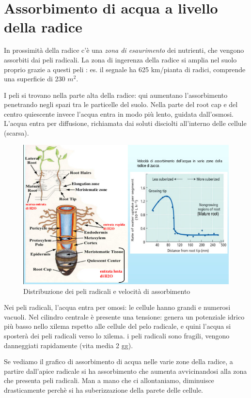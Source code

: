 \documentclass[a4paper,12pt]{book}
\begin{document}
\section{Assorbimento di acqua a livello della radice}
In prossimità della radice c'è  una \emph{zona di esaurimento} dei nutrienti, che vengono assorbiti dai peli radicali. La zona di ingerenza della radice si amplia nel suolo proprio grazie a questi peli : es. il segnale ha 625 km/pianta di radici, comprende una superficie di 230 $m^{2}$.


I peli si trovano nella parte alta della radice: qui aumentano l'assorbimento penetrando negli spazi tra le particelle del suolo. Nella parte del root cap e del centro quiescente invece l'acqua entra in modo più lento, guidata dall'osmosi. L'acqua entra per diffusione, richiamata dai soluti disciolti all'interno delle cellule (scarsa). 
\begin{figure}[H]
\centering
\includegraphics[scale=0.5]{immagini/radice.jpg}
\caption{Distribuzione dei peli radicali e velocità di assorbimento}
\end{figure}
Nei peli radicali, l'acqua entra per omosi: le cellule hanno grandi e numerosi vacuoli. Nel cilindro centrale è presente una tensione: genera un potenziale idrico più basso nello xilema rspetto alle cellule del pelo radicale, e quini l'acqua si sposterà dei peli radicali verso lo xilema. 
i peli radicali sono fragili, vengono danneggiati rapidamente (vita media 2 gg).

Se vediamo il grafico di assorbimento di acqua nelle varie zone della radice, a partire dall'apice radicale si ha assorbimento che aumenta avvicinandosi alla zona che presenta peli radicali. Man a mano che ci allontaniamo, diminuisce drasticamente perchè si ha suberizzazione della parete delle cellule.
\end{document}

